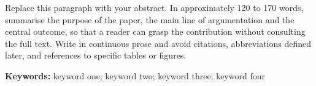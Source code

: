 
Replace this paragraph with your abstract. In approximately 120 to 170
words, summarise the purpose of the paper, the main line of
argumentation and the central outcome, so that a reader can grasp the
contribution without consulting the full text. Write in continuous prose
and avoid citations, abbreviations defined later, and references to
specific tables or figures.

\vspace{1em}
\noindent\textbf{Keywords:} keyword one; keyword two; keyword three; keyword four
